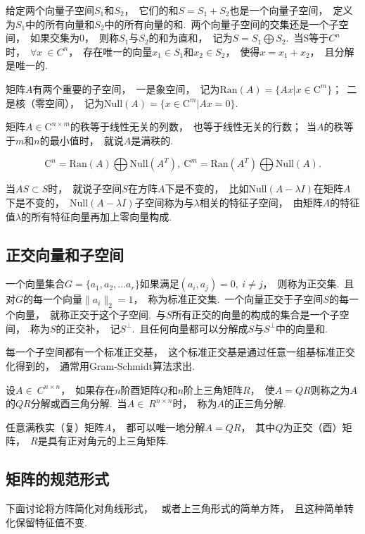 \documentclass{article}
\newcommand{\Null}{\text{Null}}
\newcommand{\Ran}{\text{Ran}}
\begin{document}
给定两个向量子空间$S_1$和$S_2$，~它们的和$S=S_1+S_2$也是一个向量子空间，~定义为$S_1$中的所有向量和$S_2$中的所有向量的和.~两个向量子空间的交集还是一个子空间，~如果交集为${0}$，~则称$S_1$与$S_2$的和为直和，~记为$S=S_1\bigoplus S_2$.~当S等于$C^n$时，~$\forall x\ \in C^n$，~存在唯一的向量$x_1\in S_1$和$x_2\in S_2$，~使得$x=x_1+x_2$，~且分解是唯一的.

矩阵$A$有两个重要的子空间，~一是象空间，~记为$ \Ran(A)=\lbrace Ax|x\in\mathrm{C}^m\rbrace$；~二是核（零空间），~记为$ \Null(A)=\lbrace x\in\mathrm{C}^m|Ax=0\rbrace$.
 
矩阵$A\in\mathrm{C}^{n\times m}$的秩等于线性无关的列数，~也等于线性无关的行数；~当$A$的秩等于$m$和$n$的最小值时，~就说$A$是满秩的.

$$\mathrm{C}^n=\Ran(A)\bigoplus \Null(A^T),\ \mathrm{C}^m=\Ran(A^T)\bigoplus \Null(A).$$

当$AS\subset S$时，~就说子空间$S$在方阵$A$下是不变的，~比如$ \Null(A-\lambda I)$在矩阵$A$下是不变的，~$ \Null(A-\lambda I)$子空间称为与$\lambda$相关的特征子空间，~由矩阵$A$的特征值$\lambda$的所有特征向量再加上零向量构成.


\subsection{正交向量和子空间}
一个向量集合$G=\lbrace a_1,a_2,...a_r\rbrace$如果满足$(a_i,a_j)=0,~i\neq j$，~则称为正交集.~且对$G$的每一个向量$\parallel a_i \parallel_2=1$，~称为标准正交集.~一个向量正交于子空间$S$的每一个向量，~就称正交于这个子空间.~与$S$所有正交的向量的构成的集合是一个子空间，~称为$S$的正交补，~记$S^\perp$.~且任何向量都可以分解成$S$与$S^\perp$中的向量和.

每一个子空间都有一个标准正交基，~这个标准正交基是通过任意一组基标准正交化得到的，~通常用Gram-Schmidt算法求出.

\begin{definition}
设$A\in ~C^{n\times n}$，~如果存在$n$阶酉矩阵$Q$和$n$阶上三角矩阵$R$，~使$A=QR$则称之为$A$的$QR$分解或酉三角分解.~当$A\in~ R^{n\times n}$时，\ 称为$A$的正三角分解.
\end{definition}

任意满秩实（复）矩阵$A$，~都可以唯一地分解$A=QR$，~其中$Q$为正交（酉）矩阵，~$R$是具有正对角元的上三角矩阵.
\subsection{矩阵的规范形式}
下面讨论将方阵简化对角线形式，~ 或者上三角形式的简单方阵，~且这种简单转化保留特征值不变.
\end{document}
